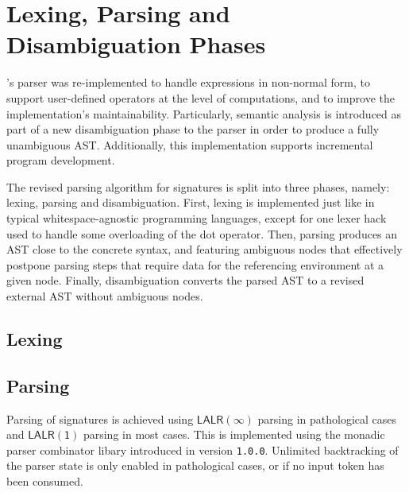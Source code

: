 


\section{\Beluga Lexing, Parsing and Disambiguation Phases}

\Beluga's parser was re-implemented to handle expressions in non-normal form, to support user-defined operators at the level of computations, and to improve the implementation's maintainability.
Particularly, semantic analysis is introduced as part of a new disambiguation phase to the parser in order to produce a fully unambiguous \ac{AST}.
Additionally, this implementation supports incremental program development.

The revised parsing algorithm for \Beluga signatures is split into three phases, namely: lexing, parsing and disambiguation.
First, lexing is implemented just like in typical whitespace-agnostic programming languages, except for one lexer hack used to handle some overloading of the dot operator.
Then, parsing produces an \ac{AST} close to the concrete syntax, and featuring ambiguous nodes that effectively postpone parsing steps that require data for the referencing environment at a given node.
Finally, disambiguation converts the parsed \ac{AST} to a revised external \ac{AST} without ambiguous nodes.

\subsection{Lexing}


\subsection{Parsing}

Parsing of \Beluga signatures is achieved using $ \mathsf{LALR(\infty)} $ parsing in pathological cases and $ \mathsf{LALR(1)} $ parsing in most cases.
This is implemented using the monadic parser combinator libary introduced in \Beluga version \texttt{1.0.0}.
Unlimited backtracking of the parser state is only enabled in pathological cases, or if no input token has been consumed.

